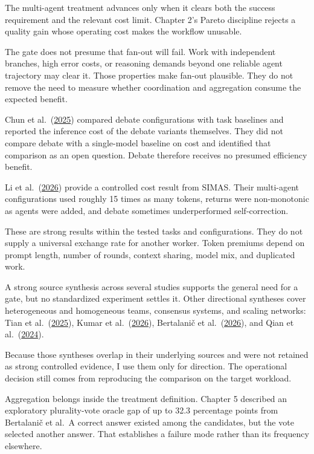 The multi-agent treatment advances only when it clears both the success requirement and the relevant cost limit. Chapter 2's Pareto discipline rejects a quality gain whose operating cost makes the workflow unusable.

The gate does not presume that fan-out will fail. Work with independent branches, high error costs, or reasoning demands beyond one reliable agent trajectory may clear it. Those properties make fan-out plausible. They do not remove the need to measure whether coordination and aggregation consume the expected benefit.

Chun et al.~(\href{https://arxiv.org/abs/2503.12029}{2025}) compared debate configurations with task baselines and reported the inference cost of the debate variants themselves. They did not compare debate with a single-model baseline on cost and identified that comparison as an open question. Debate therefore receives no presumed efficiency benefit.

Li et al.~(\href{https://arxiv.org/abs/2606.00655}{2026}) provide a controlled cost result from SIMAS. Their multi-agent configurations used roughly 15 times as many tokens, returns were non-monotonic as agents were added, and debate sometimes underperformed self-correction.

These are strong results within the tested tasks and configurations. They do not supply a universal exchange rate for another worker. Token premiums depend on prompt length, number of rounds, context sharing, model mix, and duplicated work.

A strong source synthesis across several studies supports the general need for a gate, but no standardized experiment settles it. Other directional syntheses cover heterogeneous and homogeneous teams, consensus systems, and scaling networks: Tian et al.~(\href{https://arxiv.org/abs/2509.23537}{2025}), Kumar et al.~(\href{https://arxiv.org/abs/2604.13120}{2026}), Bertalani\v{c} et al.~(\href{https://arxiv.org/abs/2605.00914}{2026}), and Qian et al.~(\href{https://arxiv.org/abs/2406.07155}{2024}).

Because those syntheses overlap in their underlying sources and were not retained as strong controlled evidence, I use them only for direction. The operational decision still comes from reproducing the comparison on the target workload.

Aggregation belongs inside the treatment definition. Chapter 5 described an exploratory plurality-vote oracle gap of up to 32.3 percentage points from Bertalani\v{c} et al.~A correct answer existed among the candidates, but the vote selected another answer. That establishes a failure mode rather than its frequency elsewhere.

